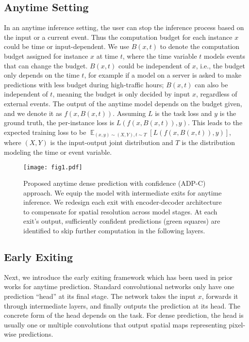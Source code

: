 \subsection{Anytime Setting}
\label{sec:anytime}
In an anytime inference setting, the user can stop the inference process based on the input or a current event.
Thus the computation budget for each instance $x$ could be time or input-dependent.
We use $B(x, t)$ to denote the computation budget assigned for instance $x$ at time $t$, where the time variable $t$ models events that can change the budget.
$B(x, t)$ could be independent of $x$, i.e., the budget only depends on the time $t$, for example if a model on a server is asked to make predictions with less budget during high-traffic hours; $B(x, t)$ can also be independent of $t$, meaning the budget is only decided by input $x$, regardless of external events.
The output of the anytime model depends on the budget given, and we denote it as $f(x, B(x, t))$.
Assuming $L$ is the task loss and $y$ is the ground truth, the per-instance loss is $L(f\left(x, B\left(x, t\right)\right), y)$.
This leads to the expected training loss to be $\mathop{\mathbb{E}}_{(x,y)\sim (X, Y), t\sim T}[L(f\left(x, B\left(x, t\right)\right), y)]$, where $(X, Y)$ is the input-output joint distribution and $T$ is the distribution modeling the time or event variable.

\begin{figure}[!htbp]
\texttt{[image: fig1.pdf]}
\caption{%
Proposed anytime dense prediction with confidence (ADP-C) approach. 
We equip the model with intermediate exits for anytime inference.
We redesign each exit with encoder-decoder architecture to compensate for spatial resolution across model stages.
At each exit's output, sufficiently confident predictions (green squares) are identified to skip further computation in the following layers.
}
\label{fig:fig1}
\end{figure}
\subsection{Early Exiting}
Next, we introduce the early exiting framework which has been used in prior works \cite{huang2017multi,teerapittayanon2016branchynet} for anytime prediction. Standard convolutional networks only have one prediction ``head'' at its final stage.
The network takes the input $x$, forwards it through intermediate layers, and finally outputs the prediction at its head.
The concrete form of the head depends on the task. 
For dense prediction, the head is usually one or multiple convolutions that output spatial maps representing pixel-wise predictions. 

